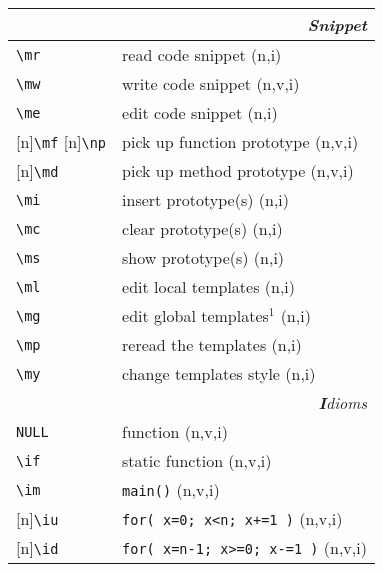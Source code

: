 \documentclass[oneside,11pt,landscape,DIV16]{scrartcl}
\newcommand{\Rep}{{\tiny{[n]}}}
\begin{document}
\begin{multicols}{3}
\begin{center}
%
\begin{tabular}[]{|p{11mm}|p{60mm}|}
\hline 
\multicolumn{2}{|r|}{\textsl{S\textbf{n}ippet}} \\
\hline     \verb'\mr'  & read code snippet         \hfill (n,i)\\
\hline     \verb'\mw'  & write code snippet        \hfill (n,v,i)\\
\hline     \verb'\me'  & edit code snippet         \hfill (n,i)\\
\hline \Rep\verb'\mf' \Rep\verb'\np'  & pick up function prototype         \hfill (n,v,i)\\
\hline \Rep\verb'\md'  & pick up method prototype         \hfill (n,v,i)\\
\hline     \verb'\mi'  & insert prototype(s)       \hfill (n,i)\\
\hline     \verb'\mc'  & clear  prototype(s)       \hfill (n,i)\\
\hline     \verb'\ms'  & show   prototype(s)       \hfill (n,i)\\
%
\hline \verb'\ml' & edit local templates      \hfill (n,i)\\
\hline \verb'\mg' & edit global templates$^1$ \hfill (n,i)\\
\hline \verb'\mp' & reread the templates      \hfill (n,i)\\
\hline \verb'\my' & change templates style    \hfill (n,i)\\
\hline
\hline 
\multicolumn{2}{|r|}{\textsl{\textbf{I}dioms}}   \\
\hline \verb'NULL'  & function                         \hfill (n,v,i)\\
\hline \verb'\if' & static function                  \hfill (n,v,i)\\
\hline \verb'\im'  & \verb'main()'                    \hfill (n,v,i)\\
\hline \Rep\verb'\iu'  & \verb'for( x=0; x<n; x+=1 )'     \hfill (n,v,i)\\
\hline \Rep\verb'\id'  & \verb'for( x=n-1; x>=0; x-=1 )'  \hfill (n,v,i)\\

\end{tabular}
\end{center}
\end{multicols}
\end{document}
